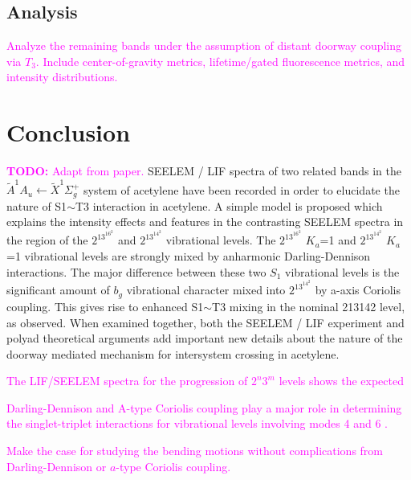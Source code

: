 \documentclass[12pt]{mitthesis}
\newcommand{\TODO} [1]{\textcolor{magenta}{\textbf{TODO:} #1}}
\newcommand{\POINT}[1]{\textcolor{magenta}{#1}}
\begin{document}
\subsection{Analysis}

\POINT{Analyze the remaining bands under the assumption of distant
  doorway coupling via $T_3$.  Include center-of-gravity metrics,
  lifetime/gated fluorescence metrics, and intensity distributions.}

\section{Conclusion}

\TODO{Adapt from paper.}  SEELEM / LIF spectra of two related bands in
the $\tilde{A}^1A_u \leftarrow \tilde{X} ^1\Sigma_g^+$ system of
acetylene have been recorded in order to elucidate the nature of
S1$\sim$T3 interaction in acetylene. A simple model is proposed which
explains the intensity effects and features in the contrasting SEELEM
spectra in the region of the $2^13^16^2$ and $2^13^14^2$ vibrational
levels. The $2^13^16^2$ $K_a$=1 and $2^13^14^2$ $K_a$=1 vibrational
levels are strongly mixed by anharmonic Darling-Dennison
interactions. The major difference between these two $S_1$ vibrational
levels is the significant amount of $b_g$ vibrational character mixed
into $2^13^14^2$ by a-axis Coriolis coupling. This gives rise to
enhanced S1$\sim$T3 mixing in the nominal 213142 level, as observed.
When examined together, both the SEELEM / LIF experiment and polyad
theoretical arguments add important new details about the nature of
the doorway mediated mechanism for intersystem crossing in acetylene.

\POINT{The LIF/SEELEM spectra for the progression of $2^n3^m$ levels
  shows the expected}

\POINT{Darling-Dennison and A-type Coriolis coupling play a major role
  in determining the singlet-triplet interactions for vibrational
  levels involving modes 4 and 6 \cite{ochi91}.}

\POINT{Make the case for studying the bending motions without
  complications from Darling-Dennison or $a$-type Coriolis coupling.}



\end{document}
